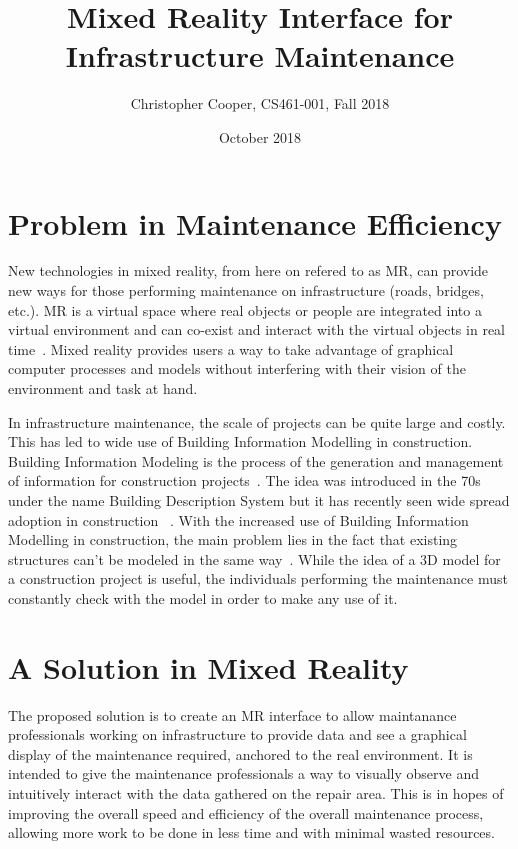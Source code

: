 \documentclass[10pt,draftclsnofoot,onecolumn]{IEEEtran}
\title{Mixed Reality Interface for Infrastructure Maintenance}
\author{Christopher Cooper, CS461-001, Fall 2018}
\date{October 2018}
\begin{document}
	\maketitle


	\newpage
	\section*{Problem in Maintenance Efficiency}

	New technologies in mixed reality, from here on refered to as MR,
	can provide new ways for those performing maintenance on infrastructure
	(roads, bridges, etc.). MR is a virtual space where real objects
	or people are integrated into a virtual environment and can co-exist and
	interact with the virtual objects in real time~\cite{MRdef}. Mixed reality
	provides users a way to take advantage of graphical computer processes and
	models without interfering with their vision of the environment and task at
	hand.

	In infrastructure maintenance, the scale of projects can be quite large and
	costly. This has led to wide use of Building Information Modelling in
	construction. Building Information Modeling is the process of the generation
	and management of information for construction projects~\cite{BIM}.
	The idea was introduced in the 70s under the name Building Description
	System but it has recently seen wide spread adoption in construction
	~\cite{BIM}. With the increased use of Building Information Modelling in
	construction, the main problem lies in the fact that existing structures
	can't be modeled in the same way~\cite{3DModelInf}. While the idea of a 3D
	model for a construction project is useful, the individuals performing the
	maintenance must constantly check with the model in order to make any use
	of it.

	\section*{A Solution in Mixed Reality}

	The proposed solution is to create an MR interface to allow maintanance
	professionals working on infrastructure to provide data and see a graphical
	display of the maintenance required, anchored to the real environment.
	It is intended to give the maintenance professionals a way to visually
	observe and intuitively interact with the data gathered on the repair area.
	This is in hopes of improving the overall speed and efficiency of the overall
	maintenance process, allowing more work to be done in less time and with
	minimal wasted resources.
\end{document}
